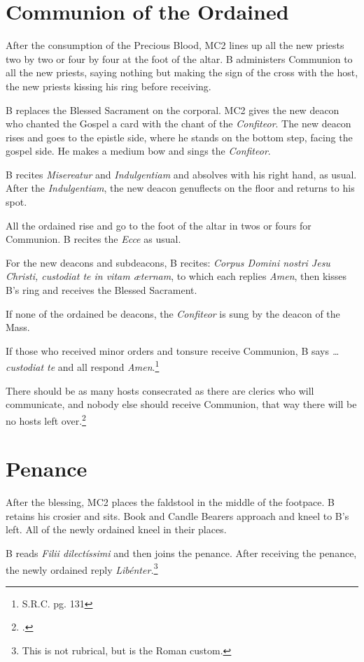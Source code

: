 \documentclass[letterpaper]{report}
\begin{document}
{    \section{Communion of the Ordained}

    \rubric After the consumption of the Precious Blood, MC2 lines up all the
    new priests two by two or four by four at the foot of the altar. B
    administers Communion to all the new priests, saying nothing but making the
    sign of the cross with the host, the new priests kissing his ring before
    receiving.

    \rubric B replaces the Blessed Sacrament on the corporal. MC2 gives the new
    deacon who chanted the Gospel a card with the chant of the
    \textit{Confiteor}. The new deacon rises and goes to the epistle side,
    where he stands on the bottom step, facing the gospel side. He makes a
    medium bow and sings the \textit{Confiteor}.

    \rubric B recites \textit{Misereatur} and \textit{Indulgentiam} and
    absolves with his right hand, as usual. After the \textit{Indulgentiam},
    the new deacon genuflects on the floor and returns to his spot.

    \rubric All the ordained rise and go to the foot of the altar in twos or
    fours for Communion. B recites the \textit{Ecce} as usual.

    \rubric For the new deacons and subdeacons, B recites: \textit{Corpus
    Domini nostri Jesu Christi, custodiat te in vitam æternam}, to which each
    replies \textit{Amen}, then kisses B's ring and receives the Blessed
    Sacrament.

    \rubric If none of the ordained be deacons, the \textit{Confiteor} is sung
    by the deacon of the Mass.

    \rubric If those who received minor orders and tonsure receive Communion, B
    says \textit{\dots custodiat te} and all respond
    \textit{Amen}.\footnote{S.R.C. pg. 131}

    \rubric There should be as many hosts consecrated as there are clerics who
    will communicate, and nobody else should receive Communion, that way there
    will be no hosts left over.\footcite[This seems to be a recommendation, not
    a command.][]{nabuco:pontificalis:1}

    \section{Penance}

    \rubric After the blessing, MC2 places the faldstool in the middle of the
    footpace. B retains his crosier and sits. Book and Candle Bearers approach
    and kneel to B's left. All of the newly ordained kneel in their places.

    \rubric B reads \textit{Filii dilectíssimi} and then joins the penance.
    After receiving the penance, the newly ordained reply
    \textit{Libénter.}\footnote{This is not rubrical, but is the Roman custom.}

}

\printbibliography
\end{document}
